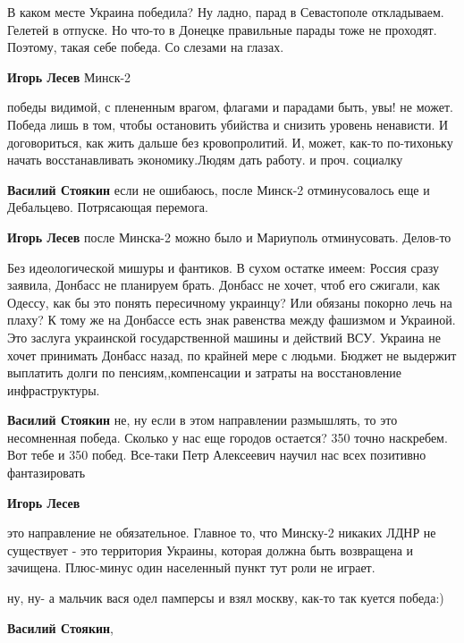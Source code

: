 \begin{itemize}
\begin{itemize}

В каком месте Украина победила? Ну ладно, парад в Севастополе откладываем.
Гелетей в отпуске. Но что-то в Донецке правильные парады тоже не проходят.
Поэтому, такая себе победа. Со слезами на глазах.


\textbf{Игорь Лесев} Минск-2


победы видимой, с плененным врагом, флагами и парадами быть, увы! не может.
Победа лишь в том, чтобы остановить убийства и снизить уровень ненависти. И
договориться, как жить дальше без кровопролитий. И, может, как-то по-тихоньку
начать восстанавливать экономику.Людям дать работу. и проч. социалку

\textbf{Василий Стоякин} если не ошибаюсь, после Минск-2 отминусовалось еще и Дебальцево. Потрясающая перемога.

\textbf{Игорь Лесев} после Минска-2 можно было и Мариуполь отминусовать. Делов-то


Без идеологической мишуры и фантиков. В сухом остатке имеем: Россия сразу
заявила, Донбасс не планируем брать. Донбасс не хочет, чтоб его сжигали, как
Одессу, как бы это понять пересичному украинцу? Или обязаны покорно лечь на
плаху? К тому же на Донбассе есть знак равенства между фашизмом и Украиной. Это
заслуга украинской государственной машины и действий ВСУ. Украина не хочет
принимать Донбасс назад, по крайней мере с людьми. Бюджет не выдержит выплатить
долги по пенсиям,,компенсации и затраты на восстановление инфраструктуры.

\textbf{Василий Стоякин} не, ну если в этом направлении размышлять, то это несомненная победа. Сколько у нас еще городов остается? 350 точно наскребем. Вот тебе и 350 побед. Все-таки Петр Алексеевич научил нас всех позитивно фантазировать

\textbf{Игорь Лесев} 

это направление не обязательное. Главное то, что Минску-2 никаких ЛДНР не
существует - это территория Украины, которая должна быть возвращена и зачищена.
Плюс-минус один населенный пункт тут роли не играет.


ну, ну- а мальчик вася одел памперсы и взял москву, как-то так куется победа:)

\textbf{Василий Стоякин}, 


\end{itemize}
\end{itemize}

